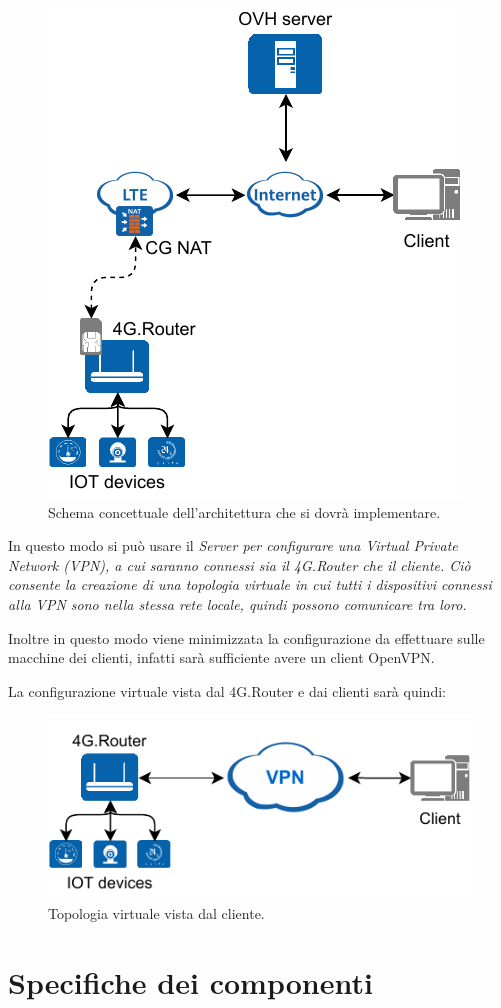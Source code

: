 \begin{figure}[H]
	\centering
	\includegraphics[width=0.5\linewidth]{immagini/diag-real}
	\caption{Schema concettuale dell'architettura che si dovrà implementare.}
	\label{fig:schem_architettura_reale}
\end{figure}

In questo modo si può usare il \it{Server} per configurare una \it{Virtual Private Network} (VPN), a cui saranno connessi sia il \it{4G.Router} che il cliente. Ciò consente la creazione di una topologia virtuale in cui tutti i dispositivi connessi alla VPN sono nella stessa rete locale, quindi possono comunicare tra loro.

Inoltre in questo modo viene minimizzata la configurazione da effettuare sulle macchine dei clienti, infatti sarà sufficiente avere un client OpenVPN.

La configurazione virtuale vista dal 4G.Router e dai clienti sarà quindi:

\begin{figure}[H]
	\centering
	\includegraphics[width=0.5\linewidth]{immagini/diag-virtual}
	\caption{Topologia virtuale vista dal cliente.}
	\label{fig:schema_architettura_virtuale}
\end{figure}

\newpage
\section{Specifiche dei componenti}

